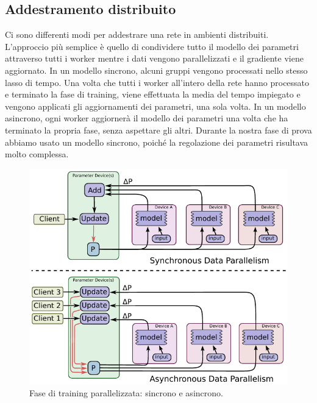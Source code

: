 \documentclass[DIV=calc, paper=a4, fontsize=11pt]{scrartcl}	 %
\begin{document}
\begin{multicols}{2}
			\subsection{Addestramento distribuito}
				Ci sono differenti modi per addestrare una rete in ambienti distribuiti. L'approccio più semplice è quello di condividere tutto il modello dei parametri attraverso tutti i worker mentre i dati vengono parallelizzati e il gradiente viene aggiornato. In un modello sincrono, alcuni gruppi vengono processati nello stesso lasso di tempo. Una volta che tutti i worker all'intero della rete hanno processato e terminato la fase di training, viene effettuata la media del tempo impiegato e vengono applicati gli aggiornamenti dei parametri, una sola volta. In un modello asincrono, ogni worker aggiornerà il modello dei parametri una volta che ha terminato la propria fase, senza aspettare gli altri. Durante la nostra fase di prova abbiamo usato un modello sincrono, poiché la regolazione dei parametri risultava molto complessa.
				\begin{figure}[H]
				\centering
				\includegraphics[scale=.55]{img/sync-async.png}
				\caption{Fase di training parallelizzata: sincrono e asincrono.}
				\label{fig:sync-async}
				\end{figure}

\end{multicols}
\end{document}
